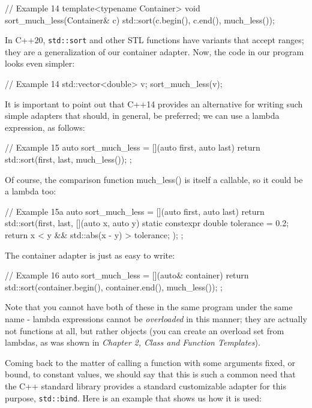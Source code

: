 \begin{code}
// Example 14
template<typename Container> void sort_much_less(Container&
   c) {
std::sort(c.begin(), c.end(), much_less());
}
\end{code}

In C++20, \texttt{std::sort} and other STL functions have variants that accept ranges; they are a generalization of our container adapter. Now, the code in our program looks even simpler:

\begin{code}
// Example 14
std::vector<double> v;
sort_much_less(v);
\end{code}

It is important to point out that C++14 provides an alternative for writing such simple adapters that should, in general, be preferred; we can use a lambda expression, as follows:

\begin{code}
// Example 15
auto sort_much_less = [](auto first, auto last) {
  return std::sort(first, last, much_less());
};
\end{code}

Of course, the comparison function much\_less() is itself a callable, so it could be a lambda too:

\begin{code}
// Example 15a
auto sort_much_less = [](auto first, auto last) {
  return std::sort(first, last,
    [](auto x, auto y) {
      static constexpr double tolerance = 0.2;
      return x < y && std::abs(x - y) > tolerance;
    }); };
\end{code}

The container adapter is just as easy to write:

\begin{code}
// Example 16
auto sort_much_less = [](auto& container) {
  return std::sort(container.begin(), container.end(),
                   much_less());
};
\end{code}

Note that you cannot have both of these in the same program under the same name - lambda expressions cannot be \emph{overloaded} in this manner; they are actually not functions at all, but rather objects (you can create an overload set from lambdas, as was shown in \emph{Chapter 2, Class and} \emph{Function Templates}).

Coming back to the matter of calling a function with some arguments fixed, or bound, to constant values, we should say that this is such a common need that the C++ standard library provides a standard customizable adapter for this purpose, \texttt{std::bind}. Here is an example that shows us how it is used:

